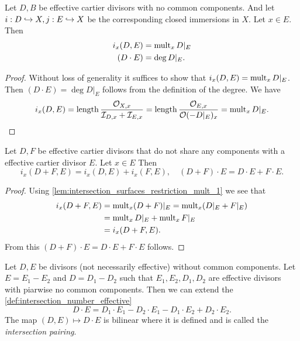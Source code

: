 \begin{lemma}\label{lem:intersection_surfaces_restriction_mult_1}
	Let $D, B$ be effective cartier divisors with no common components. And let $i: D \hookrightarrow X, j: E \hookrightarrow X$ be the corresponding closed immersions in $X$. 
	Let $x \in E$. Then  
	\begin{align*}
		i_x(D, E) &= \operatorname{mult}_x D|_E   \\
		(D\cdot E) &= \deg D|_E 
	.\end{align*}
\end{lemma}
\begin{proof}
	Without loss of generality it suffices to show that $i_x(D, E) = \operatorname{mult}_x D|_E$. Then $(D\cdot E) =\deg D|_E$ follows from the definition of the degree.  
	We have \[
		i_x(D, E) = \operatorname{length} \frac{\mathcal{O}_{X, x}}{\mathcal{I} _{D, x} + \mathcal{I} _{E, x}} =\operatorname{length} \frac{\mathcal{O}_{E, x}}{\mathcal{O}(-D|_E)_x} = \operatorname{mult}_x D|_E \\
	.\] 
\end{proof}
\begin{lemma}
	Let $D, F$ be effective cartier divisors that do not share any components with a effective cartier divisor $E$. Let $x \in E$
	Then  \[
		i_x (D + F, E) = i_x(D, E) + i_x(F, E), \quad (D + F) \cdot E = D\cdot E + F \cdot E
	.\] 
\end{lemma}
\begin{proof}
	Using \cref{lem:intersection_surfaces_restriction_mult_1} we see that 
	\begin{align*}
		i_x (D + F, E) &= \operatorname{mult}_x (D + F)|_E = \operatorname{mult}_x (D|_E + F|_E) \\
			       &= \operatorname{mult}_x D|_E + \operatorname{mult}_x F|_E \\
			       &= i_x(D + F, E) 
	.\end{align*}
	From this $(D + F) \cdot E = D\cdot E + F \cdot E$ follows.
\end{proof}


\begin{definition}
	Let $D, E$ be divisors (not necessarily effective) without common components. 
	Let $E = E_1 - E_2$ and $D = D_1 - D_2$ such that $E_1, E_2, D_1, D_2$ are effective divisors with piarwise no common components. 
	Then we can extend the \cref{def:intersection_number_effective} 
	\[
	D\cdot E = D_1 \cdot E_1 - D_2 \cdot E_1 - D_1 \cdot E_2 + D_2 \cdot  E_2
	.\] 
	The map $(D, E )\mapsto D\cdot E$ is bilinear where it is defined and is called the \emph{intersection pairing}.
\end{definition}

